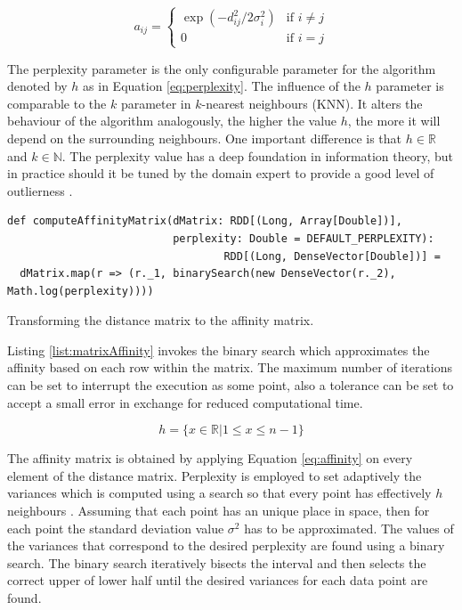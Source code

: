 \begin{equation}
a_{ij} = \begin{cases} \exp(-d_{ij}^{2} / 2 \sigma_{i}^{2}) & \text{if } i \neq j\\ 0 & \text{if } i = j \end{cases}
\label{eq:affinity}
\end{equation}

The perplexity parameter is the only configurable parameter for the algorithm denoted by $h$ as in Equation \ref{eq:perplexity}. The influence of the $h$ parameter is comparable to the $k$ parameter in $k$-nearest neighbours (KNN). It alters the behaviour of the algorithm analogously, the higher the value $h$, the more it will depend on the surrounding neighbours. One important difference is that $h \in \mathbb{R}$ and $k \in \mathbb{N}$. The perplexity value has a deep foundation in information theory, but in practice should it be tuned by the domain expert to provide a good level of outlierness \cite{MSU:CSE:00:2}.

\begin{listing}[ht!]
\begin{verbatim}
def computeAffinityMatrix(dMatrix: RDD[(Long, Array[Double])], 
                          perplexity: Double = DEFAULT_PERPLEXITY): 
                                  RDD[(Long, DenseVector[Double])] = 
  dMatrix.map(r => (r._1, binarySearch(new DenseVector(r._2), Math.log(perplexity))))
\end{verbatim}
               
\caption{Transforming the distance matrix to the affinity matrix.}
\label{list:matrixAffinity}
\end{listing}

Listing \ref{list:matrixAffinity} invokes the binary search which approximates the affinity based on each row within the matrix. The maximum number of iterations can be set to interrupt the execution as some point, also a tolerance can be set to accept a small error in exchange for reduced computational time.

\begin{equation}
h = \{x \in \mathbb{R} | 1 \leq x \leq n-1\}
\label{eq:perplexity}
\end{equation}



The affinity matrix is obtained by applying Equation \ref{eq:affinity} on every element of the distance matrix. Perplexity is employed to set adaptively the variances which is computed using a search so that every point has effectively $h$ neighbours \cite{NIPS20022276}. Assuming that each point has an unique place in space, then for each point the standard deviation value $\sigma^{2}$ has to be approximated. The values of the variances that correspond to the desired perplexity are found using a binary search. The binary search iteratively bisects the interval and then selects the correct upper of lower half until the desired variances for each data point are found.

